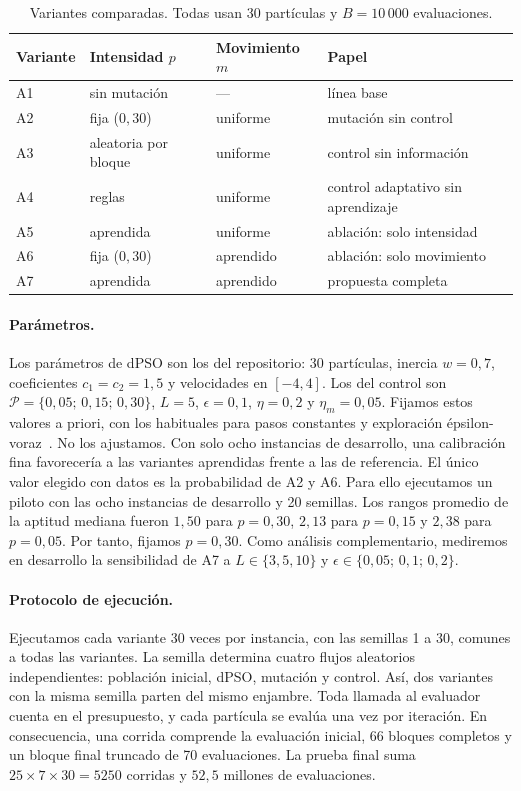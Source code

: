 \documentclass[10pt,a4paper]{article}
\newcommand{\dc}{{,}}%
\begin{document}
\begin{table}[htb]
\centering\small
\caption{Variantes comparadas. Todas usan 30 partículas y $B=10\,000$ evaluaciones.}
\label{tab:met}
\begin{tabular}{@{}llll@{}}
\toprule
Variante & Intensidad $p$ & Movimiento $m$ & Papel \\
\midrule
A1 & sin mutación & --- & línea base \\
A2 & fija ($0\dc30$) & uniforme & mutación sin control \\
A3 & aleatoria por bloque & uniforme & control sin información \\
A4 & reglas & uniforme & control adaptativo sin aprendizaje \\
A5 & aprendida & uniforme & ablación: solo intensidad \\
A6 & fija ($0\dc30$) & aprendido & ablación: solo movimiento \\
A7 & aprendida & aprendido & propuesta completa \\
\bottomrule
\end{tabular}
\end{table}

\paragraph{Parámetros.}
Los parámetros de dPSO son los del repositorio: 30 partículas, inercia $w=0\dc7$, coeficientes
$c_1=c_2=1\dc5$ y velocidades en $[-4,4]$. Los del control son
$\mathcal{P}=\{0\dc05;\,0\dc15;\,0\dc30\}$, $L=5$, $\epsilon=0\dc1$, $\eta=0\dc2$ y
$\eta_m=0\dc05$. Fijamos estos valores a priori, con los habituales para pasos constantes y
exploración épsilon-voraz~\cite{sutton2018}. No los ajustamos. Con solo ocho instancias de
desarrollo, una calibración fina favorecería a las variantes aprendidas frente a las de
referencia. El único valor elegido con datos es la probabilidad de A2 y A6. Para ello
ejecutamos un piloto con las ocho instancias de desarrollo y 20 semillas. Los rangos promedio
de la aptitud mediana fueron $1\dc50$ para $p=0\dc30$, $2\dc13$ para $p=0\dc15$ y $2\dc38$ para
$p=0\dc05$. Por tanto, fijamos $p=0\dc30$. Como análisis complementario, mediremos en desarrollo
la sensibilidad de A7 a $L\in\{3,5,10\}$ y $\epsilon\in\{0\dc05;\,0\dc1;\,0\dc2\}$.

\paragraph{Protocolo de ejecución.}
Ejecutamos cada variante 30 veces por instancia, con las semillas 1 a 30, comunes a todas las
variantes. La semilla determina cuatro flujos aleatorios independientes: población inicial,
dPSO, mutación y control. Así, dos variantes con la misma semilla parten del mismo enjambre.
Toda llamada al evaluador cuenta en el presupuesto, y cada partícula se evalúa una vez por
iteración. En consecuencia, una corrida comprende la evaluación inicial, 66 bloques completos y
un bloque final truncado de 70 evaluaciones. La prueba final suma $25\times7\times30=5250$
corridas y $52\dc5$ millones de evaluaciones.
\end{document}
